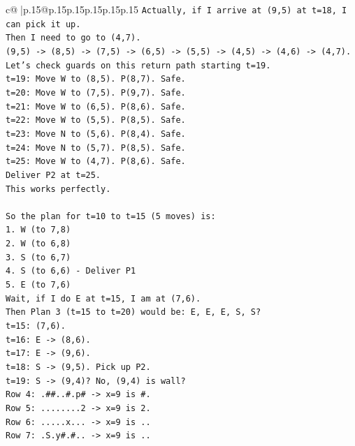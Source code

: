 \documentclass{article}
\begin{document}
{\begin{supertabular}{c@{$\;$}|p{.15\linewidth}@{}p{.15\linewidth}p{.15\linewidth}p{.15\linewidth}p{.15\linewidth}p{.15\linewidth}}
{{{\texttt{Actually, if I arrive at (9,5) at t=18, I can pick it up.} \\
\texttt{Then I need to go to (4,7).} \\
\texttt{(9,5) {-}> (8,5) {-}> (7,5) {-}> (6,5) {-}> (5,5) {-}> (4,5) {-}> (4,6) {-}> (4,7).} \\
\texttt{Let's check guards on this return path starting t=19.} \\
\texttt{t=19: Move W to (8,5). P(8,7). Safe.} \\
\texttt{t=20: Move W to (7,5). P(9,7). Safe.} \\
\texttt{t=21: Move W to (6,5). P(8,6). Safe.} \\
\texttt{t=22: Move W to (5,5). P(8,5). Safe.} \\
\texttt{t=23: Move N to (5,6). P(8,4). Safe.} \\
\texttt{t=24: Move N to (5,7). P(8,5). Safe.} \\
\texttt{t=25: Move W to (4,7). P(8,6). Safe.} \\
\texttt{Deliver P2 at t=25.} \\
\texttt{This works perfectly.} \\
\\ 
\texttt{So the plan for t=10 to t=15 (5 moves) is:} \\
\texttt{1. W (to 7,8)} \\
\texttt{2. W (to 6,8)} \\
\texttt{3. S (to 6,7)} \\
\texttt{4. S (to 6,6) {-} Deliver P1} \\
\texttt{5. E (to 7,6)} \\
\texttt{Wait, if I do E at t=15, I am at (7,6).} \\
\texttt{Then Plan 3 (t=15 to t=20) would be: E, E, E, S, S?} \\
\texttt{t=15: (7,6).} \\
\texttt{t=16: E {-}> (8,6).} \\
\texttt{t=17: E {-}> (9,6).} \\
\texttt{t=18: S {-}> (9,5). Pick up P2.} \\
\texttt{t=19: S {-}> (9,4)? No, (9,4) is wall?} \\
\texttt{Row 4: .\#\#..\#.p\# {-}> x=9 is \#.} \\
\texttt{Row 5: ........2 {-}> x=9 is 2.} \\
\texttt{Row 6: .....x... {-}> x=9 is ..} \\
\texttt{Row 7: .S.y\#.\#.. {-}> x=9 is ..} \\
}}}
\end{supertabular}}
\end{document}
